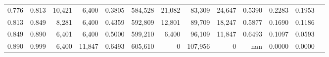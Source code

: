 \begin{tabular}{rrrrrrrrrrrrr}
0.776 & 0.813 &  10,421 &  6,400 &                                     0.3805 & 584,528 &  21,082 &  83,309 &  24,647 & 0.5390 & 0.2283 & 0.1953 \\
0.813 & 0.849 &   8,281 &  6,400 &                                     0.4359 & 592,809 &  12,801 &  89,709 &  18,247 & 0.5877 & 0.1690 & 0.1186 \\
0.849 & 0.890 &   6,401 &  6,400 &                                     0.5000 & 599,210 &   6,400 &  96,109 &  11,847 & 0.6493 & 0.1097 & 0.0593 \\
0.890 & 0.999 &   6,400 & 11,847 &                                     0.6493 & 605,610 &       0 & 107,956 &       0 &    nan & 0.0000 & 0.0000 \\
\bottomrule
\end{tabular}
